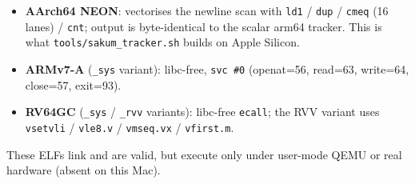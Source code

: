 \begin{itemize}
  \item \textbf{AArch64 NEON}: vectorises the newline scan with
    \texttt{ld1} / \texttt{dup} / \texttt{cmeq} (16 lanes) / \texttt{cnt};
    output is byte-identical to the scalar arm64 tracker.  This is what
    \texttt{tools/sakum\_tracker.sh} builds on Apple Silicon.
  \item \textbf{ARMv7-A} (\texttt{\_sys} variant): libc-free, \texttt{svc
    \#0} (openat=56, read=63, write=64, close=57, exit=93).
  \item \textbf{RV64GC} (\texttt{\_sys} / \texttt{\_rvv} variants):
    libc-free \texttt{ecall}; the RVV variant uses \texttt{vsetvli} /
    \texttt{vle8.v} / \texttt{vmseq.vx} / \texttt{vfirst.m}.
\end{itemize}

\noindent These ELFs link and are valid, but execute only under user-mode
QEMU or real hardware (absent on this Mac).
